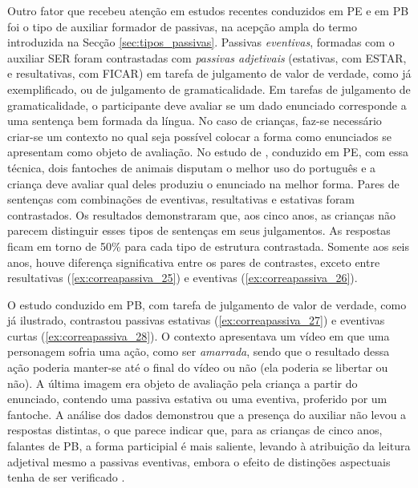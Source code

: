 \documentclass[output=paper]{LSP/langsci}
\begin{document}
Outro fator que recebeu atenção em estudos recentes conduzidos em PE e em PB foi o tipo de auxiliar formador de passivas, na acepção ampla do termo introduzida na Secção \ref{sec:tipos_passivas}. Passivas \textit{eventivas}, formadas com o auxiliar SER foram contrastadas com \textit{passivas adjetivais} (estativas, com ESTAR, e resultativas, com FICAR) em tarefa de julgamento de valor de verdade, como já exemplificado, ou de julgamento de gramaticalidade. Em tarefas de julgamento de gramaticalidade, o participante deve avaliar se um dado enunciado corresponde a uma sentença bem formada da língua. No caso de crianças, faz-se necessário criar-se um contexto no qual seja possível colocar a forma como enunciados se apresentam como objeto de avaliação. No estudo de \citet{estrela2013}, conduzido em PE, com essa técnica, dois fantoches de animais disputam o melhor uso do português e a criança deve avaliar qual deles produziu o enunciado na melhor forma. Pares de sentenças com combinações de eventivas, resultativas e estativas foram contrastados. Os resultados demonstraram que, aos cinco anos, as crianças não parecem distinguir esses tipos de sentenças em seus julgamentos. As respostas ficam em torno de 50\% para cada tipo de estrutura contrastada. Somente aos seis anos, houve diferença significativa entre os pares de contrastes, exceto entre resultativas (\ref{ex:correapassiva_25}) e eventivas (\ref{ex:correapassiva_26}).

\z
{}
\z

O estudo conduzido em PB, com tarefa de julgamento de valor de verdade, como já ilustrado, contrastou passivas estativas (\ref{ex:correapassiva_27}) e eventivas curtas (\ref{ex:correapassiva_28}). O contexto apresentava um vídeo em que uma personagem sofria uma ação, como ser \textit{amarrada}, sendo que o resultado dessa ação poderia manter-se até o final do vídeo ou não (ela poderia se libertar ou não). A última imagem era objeto de avaliação pela criança a partir do enunciado, contendo uma passiva estativa ou uma eventiva, proferido por um fantoche. A análise dos dados demonstrou que a presença do auxiliar não levou a respostas distintas, o que parece indicar que, para as crianças de cinco anos, falantes de PB, a forma participial é mais saliente, levando à atribuição da leitura adjetival mesmo a passivas eventivas, embora o efeito de distinções aspectuais tenha de ser verificado \citep{limajunior2012}. 
\end{document}
